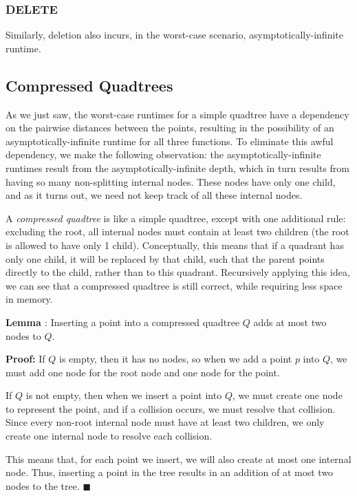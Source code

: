 \documentclass[12pt]{article}
\newcounter{lemma}
\newcommand{\lemma}[0]{\textbf{Lemma \refstepcounter{lemma}\thelemma\label{lem:\thelemma}}}
\begin{document}
        \subsubsection{DELETE}
            Similarly, deletion also incurs, in the worst-case scenario, asymptotically-infinite runtime.
        
    \subsection{Compressed Quadtrees}
        As we just saw, the worst-case runtimes for a simple quadtree have a dependency on the pairwise distances between the points, resulting in the possibility of an asymptotically-infinite runtime for all three functions. To eliminate this awful dependency, we make the following observation: the asymptotically-infinite runtimes result from the asymptotically-infinite depth, which in turn results from having so many non-splitting internal nodes. These nodes have only one child, and as it turns out, we need not keep track of all these internal nodes.
        
        A \textit{compressed quadtree} \cite{cqt} is like a simple quadtree, except with one additional rule: excluding the root, all internal nodes must contain at least two children (the root is allowed to have only 1 child). Conceptually, this means that if a quadrant has only one child, it will be replaced by that child, such that the parent points directly to the child, rather than to this quadrant. Recursively applying this idea, we can see that a compressed quadtree is still correct, while requiring less space in memory.
        
        \lemma: Inserting a point into a compressed quadtree $Q$ adds at most two nodes to $Q$.
        
        \textbf{Proof:} If $Q$ is empty, then it has no nodes, so when we add a point $p$ into $Q$, we must add one node for the root node and one node for the point.
        
        If $Q$ is not empty, then when we insert a point into $Q$, we must create one node to represent the point, and if a collision occurs, we must resolve that collision. Since every non-root internal node must have at least two children, we only create one internal node to resolve each collision.
        
        This means that, for each point we insert, we will also create at most one internal node. Thus, inserting a point in the tree results in an addition of at most two nodes to the tree. \hfill $\blacksquare$
        
\end{document}
